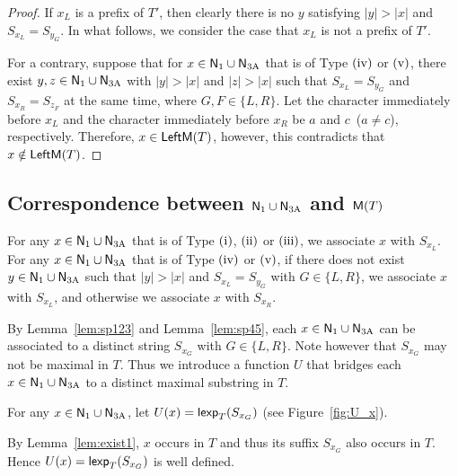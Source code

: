   
  \begin{proof}
    If $x_L$ is a prefix of $T'$, then clearly there is no $y$ satisfying
    $|y|>|x|$ and $S_{x_L}=S_{{y}_{G}}$.
    In what follows, we consider the case that $x_L$ is not a prefix of $T'$.
    
    For a contrary, 
    suppose that for $x \in \mathsf{N}_{\mathrm{1}} \cup \mathsf{N}_{\mathrm{3A}}$ that is of Type $\rm{(iv)}$ or $\rm{(v)}$, 
    there exist $y,z \in \mathsf{N}_{\mathrm{1}} \cup \mathsf{N}_{\mathrm{3A}}$ with $|y|>|x|$ and $|z|>|x|$ such that $S_{x_L}=S_{{y}_{G}}$ and $S_{x_R}=S_{{z}_{F}}$ at the same time, where $G,F \in \{L,R\}$.
    Let the character immediately before $x_L$ and the character immediately before $x_R$ be $a$ and $c$~($a \neq c$), respectively.
    Therefore, $x \in \mathsf{LeftM}(T)$, however, this contradicts that $x \notin \mathsf{LeftM}(T)$.
  \end{proof}
  

  \subsection{Correspondence between $\mathsf{N}_{\mathrm{1}} \cup \mathsf{N}_{\mathrm{3A}}$ and $\mathsf{M}(T)$}

  For any $x \in \mathsf{N}_{\mathrm{1}} \cup \mathsf{N}_{\mathrm{3A}}$ that is of Type $\rm{(i)}$, $\rm{(ii)}$ or $\rm{(iii)}$, we associate $x$ with $S_{x_L}$.
  For any $x \in \mathsf{N}_{\mathrm{1}} \cup \mathsf{N}_{\mathrm{3A}}$ that is of Type $\rm{(iv)}$ or $\rm{(v)}$, 
  if there does not exist $y\in \mathsf{N}_{\mathrm{1}} \cup \mathsf{N}_{\mathrm{3A}}$
  such that $|y|>|x|$ and 
  $S_{x_L}=S_{{y}_{G}}$ with $G \in \{L,R\}$, we associate $x$ with $S_{x_L}$, 
  and otherwise we associate $x$ with $S_{x_R}$.

  By Lemma~\ref{lem:sp123} and Lemma~\ref{lem:sp45}, each $x \in \mathsf{N}_{\mathrm{1}} \cup \mathsf{N}_{\mathrm{3A}}$ can be associated to a distinct string $S_{x_G}$ with $G \in \{L,R\}$.
  Note however that $S_{x_G}$ may not be maximal in $T$.
  Thus we introduce a function $U$
  that bridges each $x \in \mathsf{N}_{\mathrm{1}} \cup \mathsf{N}_{\mathrm{3A}}$ to a distinct maximal substring in $T$.

  \begin{definition} \label{def:U_x}
    For any $x \in \mathsf{N}_{\mathrm{1}} \cup \mathsf{N}_{\mathrm{3A}}$,
    let $U(x)=\mathsf{lexp}_T({S_{x_G}})$ (see Figure~\ref{fig:U_x}).
  \end{definition}
    By Lemma~\ref{lem:exist1}, $x$ occurs in $T$ and thus
    its suffix $S_{x_G}$ also occurs in $T$.
    Hence $U(x)=\mathsf{lexp}_T({S_{x_G}})$ is well defined.


